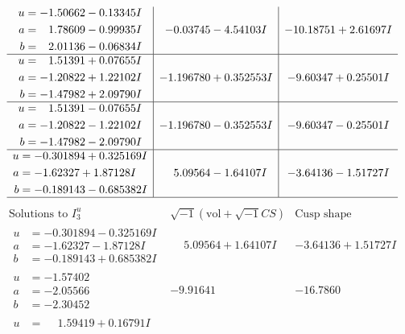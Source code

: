\documentclass[1p]{elsarticle_modified}
\theoremstyle{definition}
\newcommand{\I}{\sqrt{-1}}
\begin{document}
$$\begin{array}{c|c|c}
\begin{aligned}
u &= -1.50662 - 0.13345 I \\
a &= \phantom{-}1.78609 - 0.99935 I \\
b &= \phantom{-}2.01136 - 0.06834 I\end{aligned}
 & -0.03745 - 4.54103 I & -10.18751 + 2.61697 I \\ \hline\begin{aligned}
u &= \phantom{-}1.51391 + 0.07655 I \\
a &= -1.20822 + 1.22102 I \\
b &= -1.47982 + 2.09790 I\end{aligned}
 & -1.196780 + 0.352553 I & -9.60347 + 0.25501 I \\ \hline\begin{aligned}
u &= \phantom{-}1.51391 - 0.07655 I \\
a &= -1.20822 - 1.22102 I \\
b &= -1.47982 - 2.09790 I\end{aligned}
 & -1.196780 - 0.352553 I & -9.60347 - 0.25501 I \\ \hline\begin{aligned}
u &= -0.301894 + 0.325169 I \\
a &= -1.62327 + 1.87128 I \\
b &= -0.189143 - 0.685382 I\end{aligned}
 & \phantom{-}5.09564 - 1.64107 I & -3.64136 - 1.51727 I\\
 \hline 
 \end{array}$$\newpage$$\begin{array}{c|c|c}  
\text{Solutions to }I^u_{3}& \I (\text{vol} + \sqrt{-1}CS) & \text{Cusp shape}\\
 \hline 
\begin{aligned}
u &= -0.301894 - 0.325169 I \\
a &= -1.62327 - 1.87128 I \\
b &= -0.189143 + 0.685382 I\end{aligned}
 & \phantom{-}5.09564 + 1.64107 I & -3.64136 + 1.51727 I \\ \hline\begin{aligned}
u &= -1.57402\phantom{ +0.000000I} \\
a &= -2.05566\phantom{ +0.000000I} \\
b &= -2.30452\phantom{ +0.000000I}\end{aligned}
 & -9.91641\phantom{ +0.000000I} & -16.7860\phantom{ +0.000000I} \\ \hline\begin{aligned}
u &= \phantom{-}1.59419 + 0.16791 I \\

\end{aligned}
\end{array}$$
\end{document}
